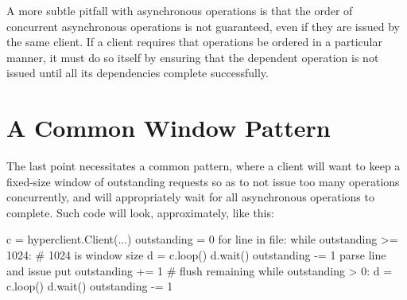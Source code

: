 A more subtle pitfall with asynchronous operations is that the order of
concurrent asynchronous operations is not guaranteed, even if they are issued by
the same client.  If a client requires that operations be ordered in a
particular manner, it must do so itself by ensuring that the dependent operation
is not issued until all its dependencies complete successfully.

\section{A Common Window Pattern}
\label{sec:async-ops:window}

The last point necessitates a common pattern, where a client will want to keep a
fixed-size window of outstanding requests so as to not issue too many operations
concurrently, and will appropriately wait for all asynchronous operations to
complete. Such code will look, approximately, like this:

 \begin{pythoncode}
c = hyperclient.Client(...)
outstanding = 0
for line in file:
    while outstanding >= 1024: # 1024 is window size
        d = c.loop()
        d.wait()
        outstanding -= 1
    parse line and issue put
    outstanding += 1
# flush remaining
while outstanding > 0:
    d = c.loop()
    d.wait()
    outstanding -= 1
\end{pythoncode}
